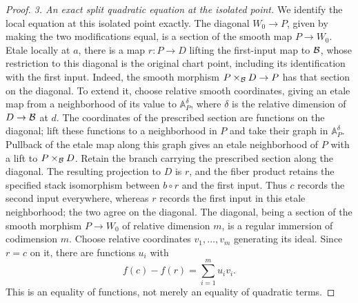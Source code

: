 \begin{proof}
\smallskip\noindent
\emph{3. An exact split quadratic equation at the isolated point.}
We identify the local equation at this isolated point exactly.  The
diagonal $W_0\to P$, given by making the two modifications equal, is a
section of the smooth map $P\to W_0$.  Etale locally at $a$, there is a
map $r:P\to D$ lifting the first-input map to $\mathcal B$, whose restriction
to this diagonal is the original chart point, including its
identification with the first input.  Indeed, the smooth morphism
$P\times_{\mathcal B}D\to P$ has that section on the diagonal.  To extend it,
choose relative smooth coordinates, giving an etale map from a
neighborhood of its value to $\mathbb A^\delta_P$, where $\delta$ is
the relative dimension of $D\to\mathcal B$ at $d$.  The coordinates of the
prescribed section are functions on the diagonal; lift these functions
to a neighborhood in $P$ and take their graph in $\mathbb A^\delta_P$.
Pullback of the etale map along this graph gives an etale neighborhood
of $P$ with a lift to $P\times_{\mathcal B}D$.  Retain the branch carrying
the prescribed section along the diagonal.  The resulting projection
to $D$ is $r$, and the fiber product retains the specified stack
isomorphism between $b\circ r$ and the first input.
Thus $c$ records the second input everywhere, whereas $r$ records the
first input in this etale neighborhood; the two agree on the diagonal.
The diagonal, being a section of the smooth morphism $P\to W_0$ of
relative dimension $m$, is a regular immersion of codimension $m$.
Choose relative coordinates $v_1,\ldots,v_m$ generating its ideal.
Since $r=c$ on it, there are functions $u_i$ with
\begin{equation}\label{eq:detection-exact-uv}
                         f(c)-f(r)=\sum_{i=1}^m u_i v_i.
\end{equation}
This is an equality of functions, not merely an equality of quadratic
terms.


\end{proof}

